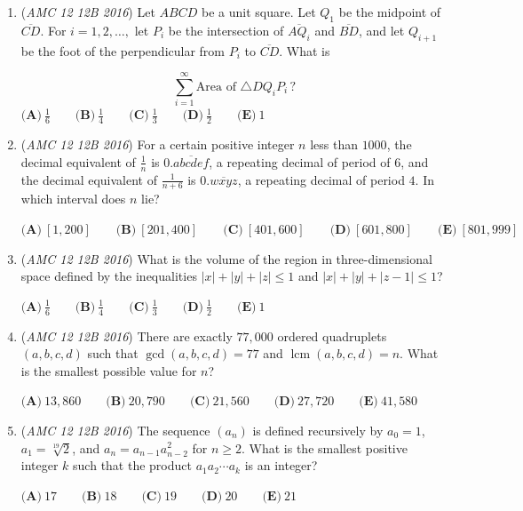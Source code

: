 \begin{enumerate}
	\item (\textit{AMC 12 12B 2016}) Let $ABCD$ be a unit square. Let $Q_1$ be the midpoint of $\overline{CD}$. For $i=1,2,\dots,$ let $P_i$ be the intersection of $\overline{AQ_i}$ and $\overline{BD}$, and let $Q_{i+1}$ be the foot of the perpendicular from $P_i$ to $\overline{CD}$. What is 

 \[\sum_{i=1}^{\infty} \text{Area of } \triangle DQ_i P_i \, ?\]
$\textbf{(A)}\ \frac{1}{6} \qquad \textbf{(B)}\ \frac{1}{4} \qquad \textbf{(C)}\ \frac{1}{3} \qquad \textbf{(D)}\ \frac{1}{2} \qquad \textbf{(E)}\ 1$


	\item (\textit{AMC 12 12B 2016}) For a certain positive integer $n$ less than $1000$, the decimal equivalent of $\frac{1}{n}$ is $0.\overline{abcdef}$, a repeating decimal of period of $6$, and the decimal equivalent of $\frac{1}{n+6}$ is $0.\overline{wxyz}$, a repeating decimal of period $4$. In which interval does $n$ lie?


 $\textbf{(A)}\ [1,200]\qquad\textbf{(B)}\ [201,400]\qquad\textbf{(C)}\ [401,600]\qquad\textbf{(D)}\ [601,800]\qquad\textbf{(E)}\ [801,999]$


	\item (\textit{AMC 12 12B 2016}) What is the volume of the region in three-dimensional space defined by the inequalities $|x|+|y|+|z|\le1$ and $|x|+|y|+|z-1|\le1$?


 $\textbf{(A)}\ \frac{1}{6}\qquad\textbf{(B)}\ \frac{1}{4}\qquad\textbf{(C)}\ \frac{1}{3}\qquad\textbf{(D)}\ \frac{1}{2}\qquad\textbf{(E)}\ 1$


	\item (\textit{AMC 12 12B 2016}) There are exactly $77,000$ ordered quadruplets $(a, b, c, d)$ such that $\gcd(a, b, c, d) = 77$ and $\operatorname{lcm}(a, b, c, d) = n$. What is the smallest possible value for $n$?


 $\textbf{(A)}\ 13,860\qquad\textbf{(B)}\ 20,790\qquad\textbf{(C)}\ 21,560 \qquad\textbf{(D)}\ 27,720 \qquad\textbf{(E)}\ 41,580$


	\item (\textit{AMC 12 12B 2016}) The sequence $(a_n)$ is defined recursively by $a_0=1$, $a_1=\sqrt[19]{2}$, and $a_n=a_{n-1}a_{n-2}^2$ for $n\geq 2$. What is the smallest positive integer $k$ such that the product $a_1a_2\cdots a_k$ is an integer?


 $\textbf{(A)}\ 17\qquad\textbf{(B)}\ 18\qquad\textbf{(C)}\ 19\qquad\textbf{(D)}\ 20\qquad\textbf{(E)}\ 21$


\end{enumerate}